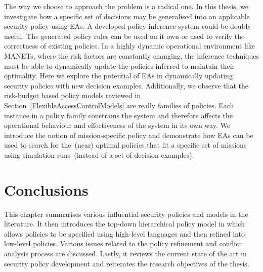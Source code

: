 The way we choose to approach the problem is a radical one. In this
thesis, we investigate how a specific set of decisions may be
generalised into an applicable security policy using EAs. A developed
policy inference system could be doubly useful. The generated policy
rules can be used on it own or used to verify the correctness of
existing policies. In a highly dynamic operational environment like
MANETs, where the risk factors are constantly changing, the inference
techniques must be able to dynamically update the policies inferred to
maintain their optimality. Here we explore the potential of EAs in
dynamically updating security policies with new decision
examples. Additionally, we observe that the risk-budget based policy
models reviewed in Section~\ref{FlexibleAccessControlModels} are
really families of policies. Each instance in a policy family
constrains the system and therefore affects the operational behaviour
and effectiveness of the system in its own way. We introduce the
notion of mission-specific policy and demonstrate how EAs can be used
to search for the~(near) optimal policies that fit a specific set of
missions using simulation runs~(instead of a set of decision
examples).

\section{Conclusions}
\label{SecurityPolicy.Conclusion}
This chapter summarises various influential security policies and
models in the literature. It then introduces the top-down hierarchical
policy model in which allows policies to be specified using high-level
languages and then refined into low-level policies. Various issues
related to the policy refinement and conflict analysis process are
discussed. Lastly, it reviews the current state of the art in security
policy development and reiterates the research objectives of the
thesis.




